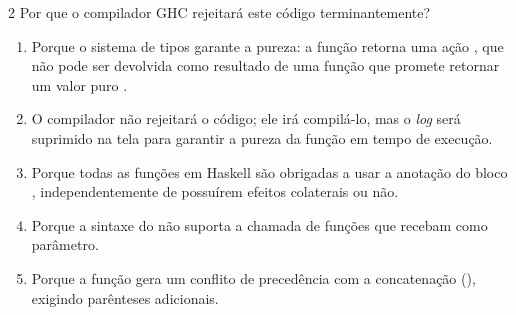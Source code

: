 \documentclass[a4paper,10pt,brazil]{article}
\begin{document}
\begin{multicols}{2}
Por que o compilador GHC rejeitará este código terminantemente?

\begin{enumerate}
  \item Porque o sistema de tipos garante a pureza: a função  retorna uma ação , que não pode ser devolvida como resultado de uma função que promete retornar um valor puro .

  \item O compilador não rejeitará o código; ele irá compilá-lo, mas o \emph{log} será suprimido na tela para garantir a pureza da função em tempo de execução.

  \item Porque todas as funções em Haskell são obrigadas a usar a anotação do bloco , independentemente de possuírem efeitos colaterais ou não.

  \item Porque a sintaxe do  não suporta a chamada de funções que recebam  como parâmetro.

  \item Porque a função  gera um conflito de precedência com a concatenação (\haskellinline{++}), exigindo parênteses adicionais.


\end{enumerate}


\end{multicols}
\end{document}
